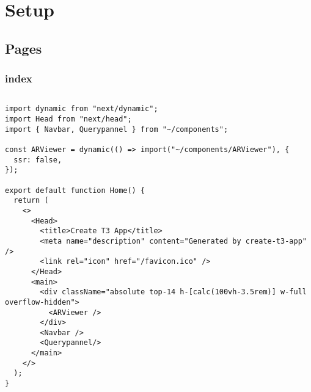 \chapter{Setup}

\section {Pages}
\subsection{index}
\inputminted{tsx}{figures/snippets/src/pages/index.tsx}
\begin{verbatim}
import dynamic from "next/dynamic";
import Head from "next/head";
import { Navbar, Querypannel } from "~/components";

const ARViewer = dynamic(() => import("~/components/ARViewer"), {
  ssr: false,
});

export default function Home() {
  return (
    <>
      <Head>
        <title>Create T3 App</title>
        <meta name="description" content="Generated by create-t3-app" />
        <link rel="icon" href="/favicon.ico" />
      </Head>
      <main>
        <div className="absolute top-14 h-[calc(100vh-3.5rem)] w-full overflow-hidden">
          <ARViewer />
        </div>
        <Navbar />
        <Querypannel/>
      </main>
    </>
  );
}
\end{verbatim}
\newpage
